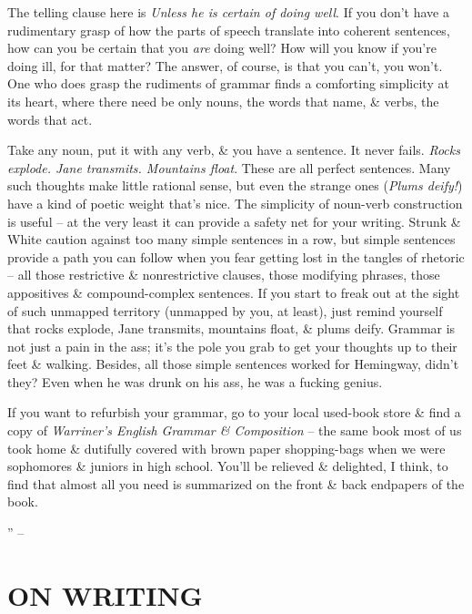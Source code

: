 \documentclass{article}
\numberwithin{equation}{section}
\begin{document}
The telling clause here is \textit{Unless he is certain of doing well}. If you don't have a rudimentary grasp of how the parts of speech translate into coherent sentences, how can you be certain that you \textit{are} doing well? How will you know if you're doing ill, for that matter? The answer, of course, is that you can't, you won't. One who does grasp the rudiments of grammar finds a comforting simplicity at its heart, where there need be only nouns, the words that name, \& verbs, the words that act.

Take any noun, put it with any verb, \& you have a sentence. It never fails. \textit{Rocks explode. Jane transmits. Mountains float}. These are all perfect sentences. Many such thoughts make little rational sense, but even the strange ones (\textit{Plums deify!}) have a kind of poetic weight that's nice. The simplicity of noun-verb construction is useful -- at the very least it can provide a safety net for your writing. Strunk \& White caution against too many simple sentences in a row, but simple sentences provide a path you can follow when you fear getting lost in the tangles of rhetoric -- all those restrictive \& nonrestrictive clauses, those modifying phrases, those appositives \& compound-complex sentences. If you start to freak out at the sight of such unmapped territory (unmapped by you, at least), just remind yourself that rocks explode, Jane transmits, mountains float, \& plums deify. Grammar is not just a pain in the ass; it's the pole you grab to get your thoughts up to their feet \& walking. Besides, all those simple sentences worked for Hemingway, didn't they? Even when he was drunk on his ass, he was a fucking genius.

If you want to refurbish your grammar, go to your local used-book store \& find a copy of \textit{Warriner's English Grammar \& Composition} -- the same book most of us took home \& dutifully covered with brown paper shopping-bags when we were sophomores \& juniors in high school. You'll be relieved \& delighted, I think, to find that almost all you need is summarized on the front \& back endpapers of the book.

'' -- \cite[pp. 86--85]{King2010}


\section{ON WRITING}
\end{document}
